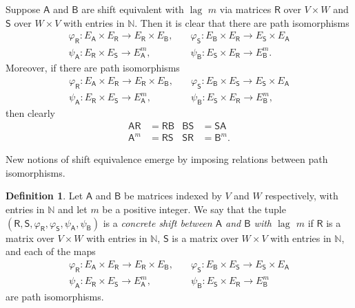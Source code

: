 \documentclass[11pt, letterpaper,final]{amsart}
\newcommand{\bbN}{{\mathbb{N}}}
\newcommand{\lag}{\operatorname{lag}}
\theoremstyle{definition}
\newtheorem{dfn}[thm]{Definition}
\begin{document}
Suppose $\mathsf{A}$ and $\mathsf{B}$ are shift equivalent with $\lag$ $m$ via matrices $\mathsf{R}$ over $V \times W$ and $\mathsf{S}$ over $W \times V$ with entries in $\bbN$.  Then it is clear that there are path isomorphisms
\begin{align*}
    \varphi_\mathsf{R} \colon E_\mathsf{A} \times E_\mathsf{R} \to E_\mathsf{R} \times E_\mathsf{B}, \quad & \varphi_\mathsf{S} \colon E_\mathsf{B} \times E_\mathsf{R} \to E_\mathsf{S} \times E_\mathsf{A} \\
    \psi_\mathsf{A} \colon E_\mathsf{R} \times E_\mathsf{S} \to E_\mathsf{A}^m, \quad & \psi_\mathsf{B} \colon E_\mathsf{S} \times E_\mathsf{R} \to E_\mathsf{B}^m.
\end{align*}
Moreover, if there are path isomorphisms 
\begin{align*}
    \varphi_\mathsf{R} \colon E_\mathsf{A} \times E_\mathsf{R} \to E_\mathsf{R} \times E_\mathsf{B}, \quad & \varphi_\mathsf{S} \colon E_\mathsf{B} \times E_\mathsf{S} \to E_\mathsf{S} \times E_\mathsf{A} \\
    \psi_\mathsf{A} \colon E_\mathsf{R} \times E_\mathsf{S} \to E_\mathsf{A}^m, \quad & \psi_\mathsf{B} \colon E_\mathsf{S} \times E_\mathsf{R} \to E_\mathsf{B}^m,
\end{align*}
then clearly
\begin{align*}
\mathsf{A}\mathsf{R} &=\mathsf{R}\mathsf{B} & \mathsf{B}\mathsf{S} &= \mathsf{S}\mathsf{A} \\ \mathsf{A}^m &= \mathsf{R}\mathsf{S}  & \mathsf{S}\mathsf{R} &= \mathsf{B}^m.
\end{align*}

New notions of shift equivalence emerge by imposing relations between path isomorphisms.

\begin{dfn}
Let $\mathsf{A}$ and $\mathsf{B}$ be matrices indexed by $V$ and $W$ respectively, with entries in $\bbN$ and let $m$ be a positive integer. We say that the tuple $(\mathsf{R}, \mathsf{S}, \varphi_\mathsf{R}, \varphi_\mathsf{S}, \psi_\mathsf{A}, \psi_\mathsf{B})$ is a \emph{concrete shift between $\mathsf{A}$ and $\mathsf{B}$ with $\lag$ $m$} if $\mathsf{R}$ is a matrix over $V \times W$ with entries in $\bbN$, $\mathsf{S}$ is a matrix over $W\times V$ with entries in $\bbN$, and each of the maps
\begin{align*}
    \varphi_\mathsf{R} \colon E_\mathsf{A} \times E_\mathsf{R} \to E_\mathsf{R} \times E_\mathsf{B}, \quad & \varphi_\mathsf{S} \colon E_\mathsf{B} \times E_\mathsf{S} \to E_\mathsf{S} \times E_\mathsf{A} \\
    \psi_\mathsf{A} \colon E_\mathsf{R} \times E_\mathsf{S} \to E_\mathsf{A}^m, \quad & \psi_\mathsf{B} \colon E_\mathsf{S} \times E_\mathsf{R} \to E_\mathsf{B}^m
\end{align*}
are path isomorphisms.
\end{dfn}
\end{document}
